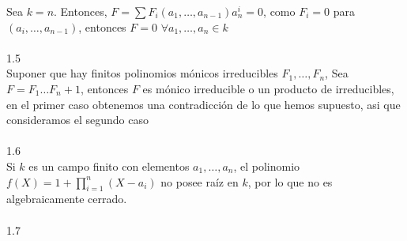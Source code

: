 \documentclass{article}
\begin{document}
Sea $k=n$. Entonces, $F=\sum F_i(a_1,\dots,a_{n-1})a_{n}^{i}=0$, como $F_i=0$ para $(a_i,\dots,a_{n-1})$, entonces $F=0$ $\forall a_1,\dots,a_n \in k$
\\
\\
1.5
\\
Suponer que hay finitos polinomios mónicos irreducibles $F_1,\dots,F_n$, Sea $F=F_1 \dots F_n +1$, entonces $F$ es mónico irreducible o un producto de irreducibles, en el primer caso obtenemos una contradicción de lo que hemos supuesto, asi que consideramos el segundo caso
\\
\\
1.6
\\
Si $k$ es un campo finito con elementos $a_1,\dots,a_n$, el polinomio $f(X)=1+\prod_{i=1}^{n}(X-a_i)$ no posee raíz en $k$, por lo que no es algebraicamente cerrado.
\\
\\
1.7
\end{document}
